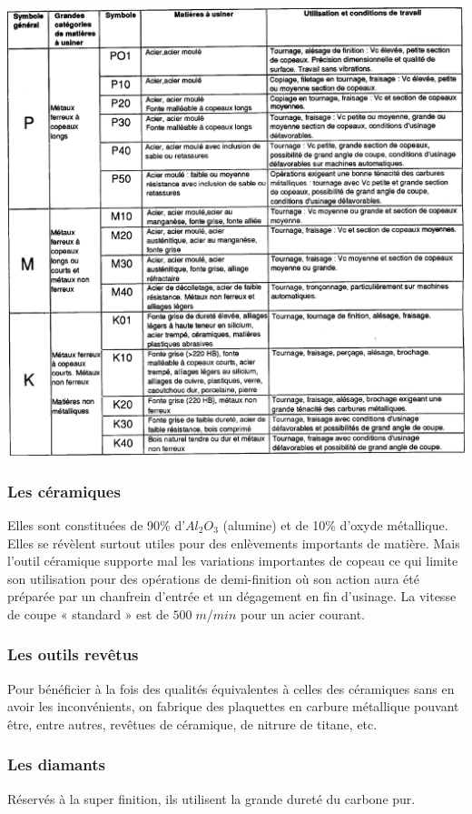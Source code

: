 \documentclass[11pt,oneside]{article}
\begin{document}
\begin{center}
\includegraphics[width=.8\textwidth]{png/fig_01}
\end{center}

\subsubsection{Les céramiques}
Elles sont constituées de 90\% d'$Al_2O_3$ (alumine) et de 10\% d'oxyde métallique. Elles se révèlent surtout utiles pour des enlèvements importants de matière. Mais l'outil céramique supporte mal les variations importantes de copeau ce qui limite son utilisation pour des opérations de demi-finition où son action aura été préparée par un chanfrein d'entrée et un dégagement en fin d'usinage. La vitesse de coupe « standard » est de $500\; m/min$ pour un acier courant.

\subsubsection{Les outils revêtus}
Pour bénéficier à la fois des qualités équivalentes à celles des céramiques sans en avoir les inconvénients, on fabrique des plaquettes en carbure métallique pouvant être, entre autres, revêtues de céramique, de nitrure de titane, etc.

\subsubsection{Les diamants}
Réservés à la super finition, ils utilisent la grande dureté du carbone pur.
\end{document}
